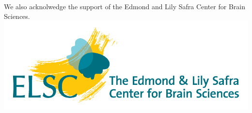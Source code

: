 \documentclass[a0,portrait]{a0poster}
\begin{document}
We also acknolwedge the support of the Edmond and Lily Safra Center for
Brain Sciences. \includegraphics{img/elsc_logo.png}
\end{document}
